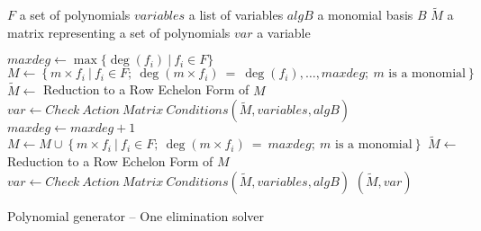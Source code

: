 \begin{algorithm}[ht]
  \begin{algorithmic}[1]
    \Require
      \Statex $F$ a set of polynomials
      \Statex $variables$ a list of variables
      \Statex $algB$ a monomial basis $B$
    \Ensure
      \Statex $\tilde{M}$ a matrix representing a set of polynomials
      \Statex $var$ a variable
      \Statex

    \State $maxdeg \gets \max\{\deg(f_i)\ |\ f_i \in F\}$
    \State $M \gets \left\{m\times f_i\ |\ f_i \in F;\ \deg(m\times f_i)\ =\ \deg(f_i),\dots,maxdeg;\ m \textrm{ is a monomial} \right\}$
    \State $\tilde{M} \gets$ Reduction to a Row Echelon Form of $M$
    \State $var \gets Check\ Action\ Matrix\ Conditions(\tilde{M}, variables, algB)$
      \State $maxdeg \gets maxdeg + 1$
      \State $M \gets M \cup \left\{m \times f_i\ |\ f_i \in F;\ \deg(m\times f_i)\ = \ maxdeg;\ m \textrm{ is a monomial}\right\}$
      \State $\tilde{M} \gets$ Reduction to a Row Echelon Form of $M$
      \State $var \gets Check\ Action\ Matrix\ Conditions(\tilde{M}, variables, algB)$
    \EndWhile
    \State \Return $(\tilde{M}, var)$
  \end{algorithmic}
  \caption{Polynomial generator -- One elimination solver}
  \label{alg:oneElGen}
\end{algorithm}

